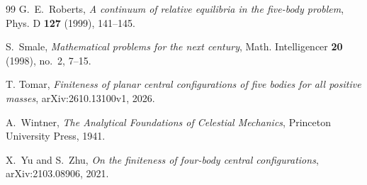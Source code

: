 \documentclass[11pt]{amsart}
\theoremstyle{definition}
\theoremstyle{remark}
\begin{document}
\begin{thebibliography}{99}
G.~E.~Roberts, \emph{A continuum of relative equilibria in the five-body problem}, Phys. D
\textbf{127} (1999), 141--145.

S.~Smale, \emph{Mathematical problems for the next century}, Math. Intelligencer \textbf{20}
(1998), no.~2, 7--15.

T. Tomar, \emph{Finiteness of planar central configurations of five bodies for all positive masses}, arXiv:2610.13100v1, 2026.


A.~Wintner, \emph{The Analytical Foundations of Celestial Mechanics}, Princeton University
Press, 1941.

X.~Yu and S.~Zhu, \emph{On the finiteness of four-body central configurations},
arXiv:2103.08906, 2021.

\end{thebibliography}
\end{document}
